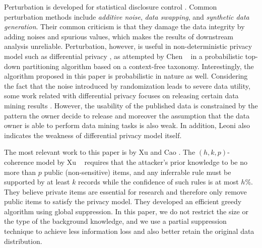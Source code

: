 Perturbation is developed for statistical disclosure control
\cite{FungWCY10:Survey}. Common perturbation methods include {\em additive
noise}, {\em data swapping}, and {\em synthetic data generation}. Their
common criticism is that they damage the data integrity by adding noises and
spurious values, which makes the results of downstream analysis unreliable.
Perturbation, however, is useful in non-deterministic privacy model such as
differential privacy \cite{Dwork:2006:diff, Dwork08:diff:survey}, as
attempted by Chen \etal~ \cite{ChenMFDX11:Diff} in a probabilistic top-down
partitioning algorithm based on a context-free taxonomy. Interestingly, the
algorithm proposed in this paper is probabilistic in nature as well.
Considering the fact that the noise introduced by randomization leads to
severe data utility, some work related with differential privacy focuses on
releasing certain data mining results
\cite{Barak:2007:PAC:1265530.1265569,Bhaskar:2010:DFP:1835804.1835869,
Friedman:2010:DMD:1835804.1835868,Korolova:2009:RSQ:1526709.1526733}.
However, the usability of the published data is constrained by the pattern
the owner decide to release and moreover the assumption that the data owner
is able to perform data mining tasks is also weak. In addition, Leoni \etal
\cite{DBLP:journals/corr/abs-1205-2726} also indicates the weakness of
differential privacy model itself.

The most relevant work to this paper is by Xu \etal \cite{Xu:2008:ATD} and
Cao \etal \cite{Cao:2010:rho}. The $(h,k,p)$-coherence model by Xu \etal~
requires that the attacker's prior knowledge to be no more than $p$ public
(non-sensitive) items, and any inferrable rule must be supported by at least
$k$ records while the confidence of such rules is at most $h$\%. They believe
private items are essential for research and therefore only remove public
items to satisfy the privacy model. They developed an efficient greedy
algorithm using global suppression. In this paper, we do not restrict the
size or the type of the background knowledge, and we use a partial
suppression technique to achieve less information loss and also better retain
the original data distribution.
%

